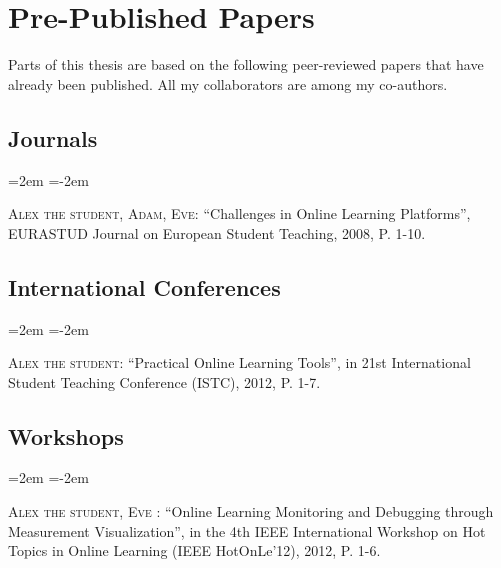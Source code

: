 \chapter*{Pre-Published Papers}
\label{chap:prepublished_papers}

Parts of this thesis are based on the following peer-reviewed papers that have already been published. All my collaborators are among my co-authors.
%

\section*{Journals}
\begin{list}{}
	{\leftmargin=2em \itemindent=-2em}
	\item 
		\textsc{Alex the student, Adam, Eve}: ``Challenges in Online Learning Platforms'', EURASTUD Journal on European Student Teaching,  2008, P. 1\hbox{-}10.
\end{list}
\smallskip

\section*{International Conferences}
\begin{list}{}
	{\leftmargin=2em \itemindent=-2em}
	\item 
		\textsc{Alex the student}: ``Practical Online Learning Tools'', in 21st International Student Teaching Conference (ISTC), 2012, P. 1\hbox{-}7.
\end{list}
\smallskip

\section*{Workshops}
\begin{list}{}
	{\leftmargin=2em \itemindent=-2em}
	\item 
	\textsc{Alex the student, Eve} : ``Online Learning Monitoring and Debugging through Measurement Visualization'', in the 4th IEEE International Workshop on Hot Topics in Online Learning (IEEE HotOnLe'12), 2012, P. 1\hbox{-}6.
\end{list}
\smallskip


